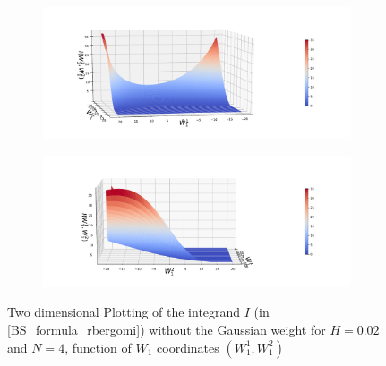 \documentclass[11pt]{article}
\begin{document}
\begin{figure}[h!]
	\centering
	\begin{subfigure}{.4\textwidth}
		\centering
		\includegraphics[width=1\linewidth]{./figures/integrand_plotting_rBergomi/2D_plots/N_4/integrand_without_density/H_002/Bergomi_integrand_contours_K_1_H_002_W1_1_2_N_4_without_weights_2_80}
		\caption{}
		\label{fig:sub3}
	\end{subfigure}%
	\begin{subfigure}{.4\textwidth}
		\centering
		\includegraphics[width=1\linewidth]{./figures/integrand_plotting_rBergomi/2D_plots/N_4/integrand_without_density/H_002/Bergomi_integrand_contours_K_1_H_002_W1_1_2_N_4_without_weights_2_0}
		\caption{}
		\label{fig:sub4}
	\end{subfigure}
	
	
	
	\caption{Two dimensional Plotting of the integrand $I$ (in \eqref{BS_formula_rbergomi}) without the Gaussian weight  for $H=0.02$ and $N=4$, function of $W_1$ coordinates $(W_1^1,W^2_1)$}
	\label{fig:Two dimensional Plotting of the integrand $I$_W12_view_set15}
\end{figure}

\FloatBarrier
\end{document}
